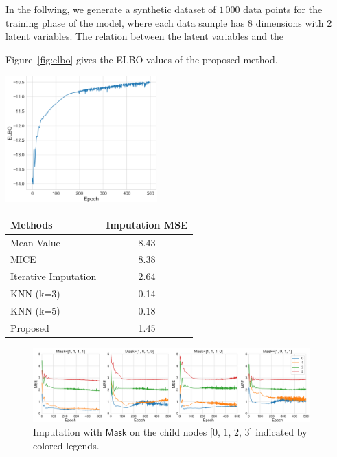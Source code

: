 \documentclass{article} %
\newcommand{\belhal}[1]{{\color{red}{\bf\sf [BK: #1]}}}
\begin{document}
In the follwing, we generate a synthetic dataset of $1\,000$ data points for the training phase of the model, where each data sample  has $8$ dimensions with $2$ latent variables.  The relation between the latent variables and the \belhal{to complete}


Figure~\ref{fig:elbo} gives the ELBO values of the proposed method. 



 \begin{minipage}{\textwidth}
  \begin{minipage}[b]{0.49\textwidth}
    \centering
   \includegraphics[width=2.3in]{fig/elbo.png}
    \label{fig:elbo}
  \end{minipage}
  \hfill
  \begin{minipage}[b]{0.49\textwidth}
    \centering
 \begin{tabular}{l | c  }\hline
Methods & Imputation MSE  \\
\hline
Mean Value &8.43 \\
\hline
MICE &8.38 \\
\hline
Iterative Imputation & 2.64 \\
\hline
KNN (k=3) &0.14 \\
\hline
KNN (k=5) &0.18 \\
\hline
Proposed &  1.45  \\  
\hline
\end{tabular}
\vspace{0.4in}
       \label{tab:causality2}
    \end{minipage}
  \end{minipage}  
  

\begin{figure}[!htbp]
    \centering
    \includegraphics[width=0.95\textwidth]{fig/mse.png}
    \caption{Imputation with $\mathsf{Mask}$ on the child nodes [0, 1, 2, 3] indicated by colored legends. }
    \label{fig:mse}
\end{figure}
\end{document}
